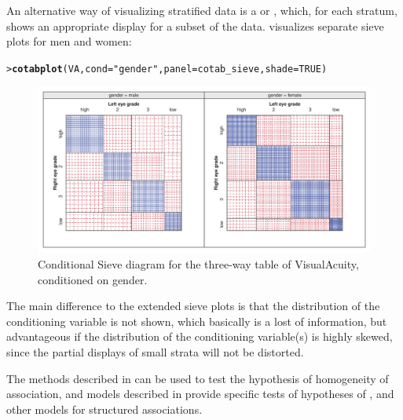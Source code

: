 \documentclass[10pt,krantz2]{krantz}\usepackage[]{graphicx}\usepackage[]{color}
\makeatletter
\newcommand{\hlnum}[1]{\textcolor[rgb]{0.686,0.059,0.569}{#1}}%
\newcommand{\hlstr}[1]{\textcolor[rgb]{0.192,0.494,0.8}{#1}}%
\newcommand{\hlstd}[1]{\textcolor[rgb]{0.345,0.345,0.345}{#1}}%
\newcommand{\hlkwc}[1]{\textcolor[rgb]{0.333,0.667,0.333}{#1}}%
\newcommand{\hlkwd}[1]{\textcolor[rgb]{0.737,0.353,0.396}{\textbf{#1}}}%
\newenvironment{kframe}{%
 \def\at@end@of@kframe{}%
 \ifinner\ifhmode%
  \def\at@end@of@kframe{\end{minipage}}%
  \begin{minipage}{\columnwidth}%
 \fi\fi%
 \def\FrameCommand##1{\hskip\@totalleftmargin \hskip-\fboxsep
 \colorbox{shadecolor}{##1}\hskip-\fboxsep
     \hskip-\linewidth \hskip-\@totalleftmargin \hskip\columnwidth}%
 \MakeFramed {\advance\hsize-\width
   \@totalleftmargin\z@ \linewidth\hsize
   \@setminipage}}%
 {\par\unskip\endMakeFramed%
 \at@end@of@kframe}
\newenvironment{knitrout}{}{} %
\renewenvironment{knitrout}{\small\renewcommand{\baselinestretch}{.85}}{} %
\makeatother
\begin{document}
An alternative way of visualizing stratified data is a 
or , which, for each stratum, shows an
appropriate display for a subset of the data. 
 visualizes separate sieve plots for men
and women:
\begin{knitrout}
\color{fgcolor}\begin{kframe}
\begin{alltt}
\hlstd{> }\hlkwd{cotabplot}\hlstd{(VA,} \hlkwc{cond} \hlstd{=} \hlstr{"gender"}\hlstd{,} \hlkwc{panel} \hlstd{= cotab_sieve,} \hlkwc{shade} \hlstd{=} \hlnum{TRUE}\hlstd{)}
\end{alltt}
\end{kframe}\begin{figure}[!htbp]

\centerline{\includegraphics[width=\textwidth]{ch04/fig/VA-cotabsieve3-1} }

\caption[Conditional Sieve diagram for the three-way table of VisualAcuity, conditioned on gender]{Conditional Sieve diagram for the three-way table of VisualAcuity, conditioned on gender.}\label{fig:VA-cotabsieve3}
\end{figure}


\end{knitrout}
\noindent The main difference to the extended sieve plots is that the
distribution of the conditioning variable is not shown, which
basically is a lost of information, but advantageous if the distribution of the conditioning variable(s) is
highly skewed, since the partial displays of small strata will not be distorted.

The methods described in  can be used to test
the hypothesis of homogeneity of association, and
\loglin models described in  provide
specific tests of hypotheses of ,
 and other models for structured associations.
\end{document}
